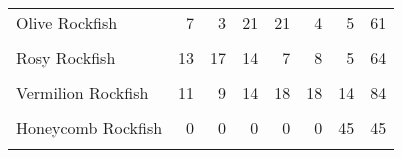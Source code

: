 \documentclass[
]{article}
\begin{document}
\begin{table}
\begin{tabular}[t]{lrrrrrrr}
Olive Rockfish & 7 & 3 & 21 & 21 & 4 & 5 & 61\\
\cellcolor{gray!6}{Quillback Rockfish} & \cellcolor{gray!6}{4} & \cellcolor{gray!6}{13} & \cellcolor{gray!6}{0} & \cellcolor{gray!6}{0} & \cellcolor{gray!6}{0} & \cellcolor{gray!6}{0} & \cellcolor{gray!6}{17}\\
Rosy Rockfish & 13 & 17 & 14 & 7 & 8 & 5 & 64\\
\cellcolor{gray!6}{Treefish} & \cellcolor{gray!6}{0} & \cellcolor{gray!6}{0} & \cellcolor{gray!6}{4} & \cellcolor{gray!6}{7} & \cellcolor{gray!6}{19} & \cellcolor{gray!6}{9} & \cellcolor{gray!6}{39}\\
\addlinespace
Vermilion Rockfish & 11 & 9 & 14 & 18 & 18 & 14 & 84\\
\cellcolor{gray!6}{Yellowtail Rockfish} & \cellcolor{gray!6}{20} & \cellcolor{gray!6}{14} & \cellcolor{gray!6}{12} & \cellcolor{gray!6}{6} & \cellcolor{gray!6}{0} & \cellcolor{gray!6}{0} & \cellcolor{gray!6}{52}\\
Honeycomb Rockfish & 0 & 0 & 0 & 0 & 0 & 45 & 45\\
\cellcolor{gray!6}{Starry Rockfish} & \cellcolor{gray!6}{0} & \cellcolor{gray!6}{0} & \cellcolor{gray!6}{0} & \cellcolor{gray!6}{0} & \cellcolor{gray!6}{4} & \cellcolor{gray!6}{0} & \cellcolor{gray!6}{4}\\
\bottomrule
\end{tabular}
\end{table}
\end{document}

